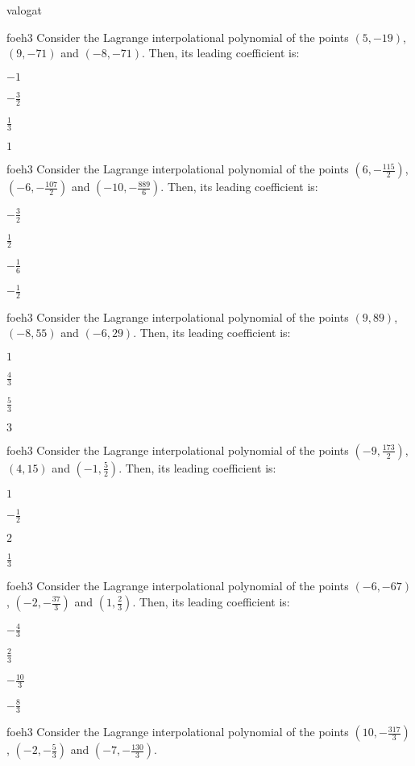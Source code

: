 \documentclass[12pt]{article}
\begin{document}
\begin{quiz}{valogat}
\begin{multi}{foeh3}
Consider the Lagrange interpolational polynomial of the points $(5,-19)$, $(9,-71)$ and $(-8,-71)$.
Then, its leading coefficient is:
\item* $ -1 $
\item  $ -\frac{3}{2} $
\item  $ \frac{1}{3} $
\item  $ 1 $
\end{multi}
\begin{multi}{foeh3}
Consider the Lagrange interpolational polynomial of the points $(6,-\frac{115}{2})$, $(-6,-\frac{107}{2})$ and $(-10,-\frac{889}{6})$.
Then, its leading coefficient is:
\item* $ -\frac{3}{2} $
\item  $ \frac{1}{2} $
\item  $ -\frac{1}{6} $
\item  $ -\frac{1}{2} $
\end{multi}
\begin{multi}{foeh3}
Consider the Lagrange interpolational polynomial of the points $(9,89)$, $(-8,55)$ and $(-6,29)$.
Then, its leading coefficient is:
\item* $ 1 $
\item  $ \frac{4}{3} $
\item  $ \frac{5}{3} $
\item  $ 3 $
\end{multi}
\begin{multi}{foeh3}
Consider the Lagrange interpolational polynomial of the points $(-9,\frac{173}{2})$, $(4,15)$ and $(-1,\frac{5}{2})$.
Then, its leading coefficient is:
\item* $ 1 $
\item  $ -\frac{1}{2} $
\item  $ 2 $
\item  $ \frac{1}{3} $
\end{multi}
\begin{multi}{foeh3}
Consider the Lagrange interpolational polynomial of the points $(-6,-67)$, $(-2,-\frac{37}{3})$ and $(1,\frac{2}{3})$.
Then, its leading coefficient is:
\item* $ -\frac{4}{3} $
\item  $ \frac{2}{3} $
\item  $ -\frac{10}{3} $
\item  $ -\frac{8}{3} $
\end{multi}
\begin{multi}{foeh3}
Consider the Lagrange interpolational polynomial of the points $(10,-\frac{317}{3})$, $(-2,-\frac{5}{3})$ and $(-7,-\frac{130}{3})$.

\end{multi}
\end{quiz}
\end{document}

